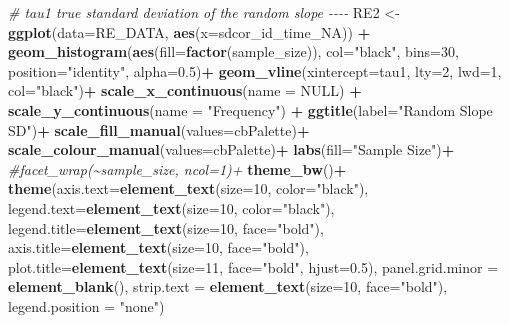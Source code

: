\documentclass[
]{article}
\newenvironment{Shaded}{\begin{snugshade}}{\end{snugshade}}
\newcommand{\AttributeTok}[1]{\textcolor[rgb]{0.13,0.29,0.53}{#1}}
\newcommand{\CommentTok}[1]{\textcolor[rgb]{0.56,0.35,0.01}{\textit{#1}}}
\newcommand{\ConstantTok}[1]{\textcolor[rgb]{0.56,0.35,0.01}{#1}}
\newcommand{\DecValTok}[1]{\textcolor[rgb]{0.00,0.00,0.81}{#1}}
\newcommand{\FloatTok}[1]{\textcolor[rgb]{0.00,0.00,0.81}{#1}}
\newcommand{\FunctionTok}[1]{\textcolor[rgb]{0.13,0.29,0.53}{\textbf{#1}}}
\newcommand{\NormalTok}[1]{#1}
\newcommand{\OtherTok}[1]{\textcolor[rgb]{0.56,0.35,0.01}{#1}}
\newcommand{\SpecialCharTok}[1]{\textcolor[rgb]{0.81,0.36,0.00}{\textbf{#1}}}
\newcommand{\StringTok}[1]{\textcolor[rgb]{0.31,0.60,0.02}{#1}}
\begin{document}
\begin{Shaded}
\begin{Highlighting}[]
\CommentTok{\# tau1 true standard deviation of the random slope {-}{-}{-}{-}}
\NormalTok{RE2 }\OtherTok{\textless{}{-}} \FunctionTok{ggplot}\NormalTok{(}\AttributeTok{data=}\NormalTok{RE\_DATA, }\FunctionTok{aes}\NormalTok{(}\AttributeTok{x=}\StringTok{\textasciigrave{}}\AttributeTok{sdcor\_id\_time\_NA}\StringTok{\textasciigrave{}}\NormalTok{)) }\SpecialCharTok{+}
  \FunctionTok{geom\_histogram}\NormalTok{(}\FunctionTok{aes}\NormalTok{(}\AttributeTok{fill=}\FunctionTok{factor}\NormalTok{(sample\_size)), }\AttributeTok{col=}\StringTok{"black"}\NormalTok{, }\AttributeTok{bins=}\DecValTok{30}\NormalTok{,}
                 \AttributeTok{position=}\StringTok{"identity"}\NormalTok{, }\AttributeTok{alpha=}\FloatTok{0.5}\NormalTok{)}\SpecialCharTok{+}
  \FunctionTok{geom\_vline}\NormalTok{(}\AttributeTok{xintercept=}\NormalTok{tau1, }\AttributeTok{lty=}\DecValTok{2}\NormalTok{, }\AttributeTok{lwd=}\DecValTok{1}\NormalTok{, }\AttributeTok{col=}\StringTok{"black"}\NormalTok{)}\SpecialCharTok{+}
  \FunctionTok{scale\_x\_continuous}\NormalTok{(}\AttributeTok{name =} \ConstantTok{NULL}\NormalTok{) }\SpecialCharTok{+}
  \FunctionTok{scale\_y\_continuous}\NormalTok{(}\AttributeTok{name =} \StringTok{"Frequency"}\NormalTok{) }\SpecialCharTok{+}
  \FunctionTok{ggtitle}\NormalTok{(}\AttributeTok{label=}\StringTok{"Random Slope SD"}\NormalTok{)}\SpecialCharTok{+}
  \FunctionTok{scale\_fill\_manual}\NormalTok{(}\AttributeTok{values=}\NormalTok{cbPalette)}\SpecialCharTok{+}
  \FunctionTok{scale\_colour\_manual}\NormalTok{(}\AttributeTok{values=}\NormalTok{cbPalette)}\SpecialCharTok{+}
  \FunctionTok{labs}\NormalTok{(}\AttributeTok{fill=}\StringTok{"Sample Size"}\NormalTok{)}\SpecialCharTok{+}
  \CommentTok{\#facet\_wrap(\textasciitilde{}sample\_size, ncol=1)+}
  \FunctionTok{theme\_bw}\NormalTok{()}\SpecialCharTok{+}
  \FunctionTok{theme}\NormalTok{(}\AttributeTok{axis.text=}\FunctionTok{element\_text}\NormalTok{(}\AttributeTok{size=}\DecValTok{10}\NormalTok{, }\AttributeTok{color=}\StringTok{"black"}\NormalTok{),}
        \AttributeTok{legend.text=}\FunctionTok{element\_text}\NormalTok{(}\AttributeTok{size=}\DecValTok{10}\NormalTok{, }\AttributeTok{color=}\StringTok{"black"}\NormalTok{),}
        \AttributeTok{legend.title=}\FunctionTok{element\_text}\NormalTok{(}\AttributeTok{size=}\DecValTok{10}\NormalTok{, }\AttributeTok{face=}\StringTok{"bold"}\NormalTok{),}
        \AttributeTok{axis.title=}\FunctionTok{element\_text}\NormalTok{(}\AttributeTok{size=}\DecValTok{10}\NormalTok{, }\AttributeTok{face=}\StringTok{"bold"}\NormalTok{),}
        \AttributeTok{plot.title=}\FunctionTok{element\_text}\NormalTok{(}\AttributeTok{size=}\DecValTok{11}\NormalTok{, }\AttributeTok{face=}\StringTok{"bold"}\NormalTok{, }\AttributeTok{hjust=}\FloatTok{0.5}\NormalTok{),}
        \AttributeTok{panel.grid.minor =} \FunctionTok{element\_blank}\NormalTok{(),}
        \AttributeTok{strip.text =} \FunctionTok{element\_text}\NormalTok{(}\AttributeTok{size=}\DecValTok{10}\NormalTok{, }\AttributeTok{face=}\StringTok{"bold"}\NormalTok{),}
        \AttributeTok{legend.position =} \StringTok{"none"}\NormalTok{)}


\end{Highlighting}
\end{Shaded}
\end{document}
